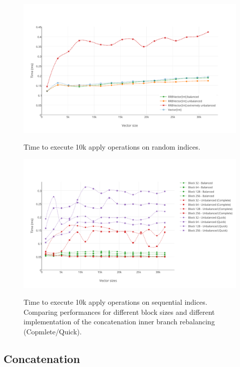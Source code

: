 \begin{figure}[h!]
  \centering
  \includegraphics[width=\textwidth]{Benchmarks/Apply_random_3.pdf}
  \label{ApplyRandomBenchmarks}
  \caption{Time to execute 10k apply operations on random indices.}
\end{figure}

\begin{figure}[h!]
  \centering
  \includegraphics[width=\textwidth]{Benchmarks/apply_blocks.pdf}
  \label{ApplyBlocksBenchmarks}
  \caption{Time to execute 10k apply operations on sequential indices. Comparing performances for different block sizes and different implementation of the concatenation inner branch rebalancing (Copmlete/Quick).}
\end{figure}

\subsection{Concatenation}

